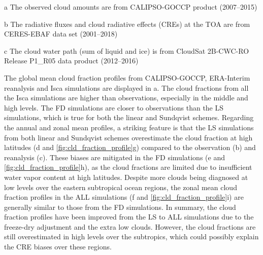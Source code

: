 \begin{sidewaystable}
\begin{threeparttable}
    \begin{tablenotes}
      \item[a] The observed cloud amounts are from CALIPSO-GOCCP \citep{Chepfer2010} product (2007--2015)
      \item[b] The radiative fluxes and cloud radiative effects (CREs) at the TOA are from CERES-EBAF \citep{Loeb2018} data set (2001--2018)
      \item[c] The cloud water path (sum of liquid and ice) is from CloudSat 2B-CWC-RO Release P1\_R05 \citep{Austin2009} data product (2012--2016)
     \end{tablenotes}
     
    \end{threeparttable}
    \label{tab:global_mean_climate}
\end{sidewaystable}

The global mean cloud fraction profiles from CALIPSO-GOCCP, ERA-Interim reanalysis and Isca simulations are displayed in a. The cloud fractions from all the Isca simulations are higher than observations, especially in the middle and high levels. The FD simulations are closer to observations than the LS simulations, which is true for both the linear and Sundqvist schemes. Regarding the annual and zonal mean profiles, a striking feature is that the LS simulations from both linear and Sundqvist schemes overestimate the cloud fraction at high latitudes (d and \ref{fig:cld_fraction_profile}g) compared to the observation (b) and reanalysis (c). These biases are mitigated in the FD simulations (e and \ref{fig:cld_fraction_profile}h), as the cloud fractions are limited due to insufficient water vapor content at high latitudes. Despite more clouds being diagnosed at low levels over the eastern subtropical ocean regions, the zonal mean cloud fraction profiles in the ALL simulations (f and \ref{fig:cld_fraction_profile}i) are generally similar to those from the FD simulations. In summary, the cloud fraction profiles have been improved from the LS to ALL simulations due to the freeze-dry adjustment and the extra low clouds. However, the cloud fractions are still overestimated in high levels over the subtropics, which could possibly explain the CRE biases over these regions.

